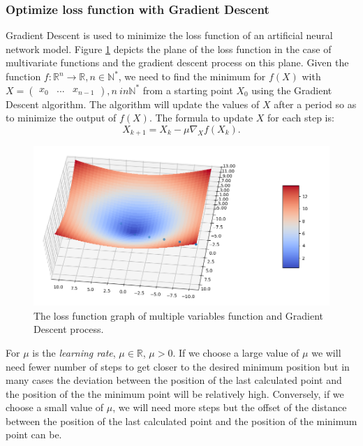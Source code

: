 \documentclass[conference]{IEEEtran}
\begin{document}
\subsubsection{Optimize loss function with Gradient Descent}
Gradient Descent \cite[p.158-174]{tiep:2017} is used to minimize the loss function of an artificial neural network model. Figure \ref{fig:3dgradient_descent} depicts the plane of the loss function in the case of multivariate functions and the gradient descent process on this plane. Given the function $ f: {{\mathbb {R}} ^ n} {\rightarrow} {\mathbb {R}}, n {\in} {\mathbb {N}} ^ * $, we need to find the minimum for $ f(X) $ with $ X = \begin{pmatrix} x_0 & ... & x_ {n-1} \end{pmatrix}, n {\ in} {\mathbb {N}} ^ * $ from a starting point $ X_0 $ using the Gradient Descent algorithm. The algorithm will update the values of $X$ after a period so as to minimize the output of $f(X)$. The formula to update $X$ for each step is:
\begin{equation}
	X_{k+1}=X_{k}-{\mu}{{\nabla}_X}f\left(X_{k}\right).
\end{equation}
\begin{figure}[ht!]
	\centerline{\includegraphics[scale=0.4]{images/3dgradient_descent.png}}
  	\caption{The loss function graph of multiple variables function and Gradient Descent process.}
  	\label{fig:3dgradient_descent}
\end{figure}
For $ \mu $ is the \emph{learning rate}, $ {\mu} {\in} {\mathbb {R}} $, $ {\mu}> 0 $. If we choose a large value of $ \mu $ we will need fewer number of steps to get closer to the desired minimum position but in many cases the deviation between the position of the last calculated point and the position of the the minimum point will be relatively high. Conversely, if we choose a small value of $ \mu $, we will need more steps but the offset of the distance between the position of the last calculated point and the position of the minimum point can be.
\end{document}
